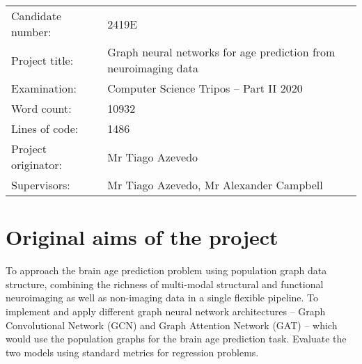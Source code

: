 \begin{tabular}{ll}
Candidate number:   & 2419E                  \\
Project title:      & Graph neural networks for age prediction from neuroimaging data \\
Examination:        & Computer Science Tripos -- Part II 2020 \\
Word count:         & 10932\footnotemark[1] \\
Lines of code:      & 1486  \\
Project originator: & Mr Tiago Azevedo                        \\
Supervisors:        & Mr Tiago Azevedo, Mr Alexander Campbell \\ 
\end{tabular}


\section*{Original aims of the project}

To approach the brain age prediction problem using population graph data structure, combining the richness of multi-modal structural and functional neuroimaging as well as non-imaging data in a single flexible pipeline.
To implement and apply different graph neural network architectures – Graph Convolutional Network (GCN) and Graph Attention Network (GAT) – which would use the population graphs for the brain age prediction task. Evaluate the two models using standard metrics for regression problems.


